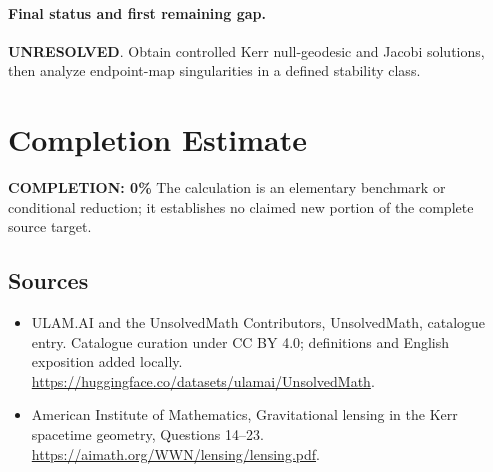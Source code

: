\documentclass[11pt]{article}
\begin{document}
\paragraph{Final status and first remaining gap.}
\textbf{UNRESOLVED}. Obtain controlled Kerr null-geodesic and Jacobi solutions, then analyze endpoint-map singularities in a defined stability class.

\section{Completion Estimate}
\noindent\textbf{COMPLETION: 0\%}
The calculation is an elementary benchmark or conditional reduction; it establishes no claimed new portion of the complete source target.

\subsection{Sources}
\begin{itemize}
\item[\hypertarget{source:statement:1}{S1}] ULAM.AI and the UnsolvedMath Contributors, UnsolvedMath, catalogue entry. Catalogue curation under CC BY 4.0; definitions and English exposition added locally.
\url{https://huggingface.co/datasets/ulamai/UnsolvedMath}.
\item[\hypertarget{source:statement:2}{S2}] American Institute of Mathematics, Gravitational lensing in the Kerr spacetime geometry, Questions 14–23.
\url{https://aimath.org/WWN/lensing/lensing.pdf}.
\end{itemize}
\label{end:statement}
\end{document}
